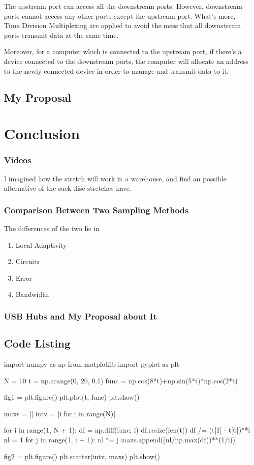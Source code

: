 \documentclass{article}
\begin{document}
The upstream port can access all the downstream ports. However, downstream ports cannot access any other ports except the upstream port. What's more, Time Division Multiplexing are applied to avoid the mess that all downstream ports transmit data at the same time.

Moreover, for a computer which is connected to the upstream port, if there's a device connected to the downstream ports, the computer will allocate an address to the newly connected device in order to manage and transmit data to it.

\subsection{My Proposal}




\section{Conclusion}
\subsubsection*{Videos}
I imagined how the stretch will work in a warehouse, and find an possible alternative of the suck disc stretches have.
\subsubsection*{Comparison Between Two Sampling Methods}
The differences of the two lie in
\begin{enumerate}
	\item Local Adaptivity
	\item Circuits
	\item Error
	\item Bandwidth
\end{enumerate}
\subsubsection*{USB Hubs and My Proposal about It}




\begin{appendices}
\section{Code Listing}
\begin{python}
import numpy as np
from matplotlib import pyplot as plt

N = 10
t = np.arange(0, 20, 0.1)
func = np.cos(8*t)+np.sin(5*t)*np.cos(2*t)

fig1 = plt.figure()
plt.plot(t, func)
plt.show()

maxs = []
intv = [i for i in range(N)]

for i in range(1, N + 1):
    df = np.diff(func, i)
    df.resize(len(t))
    df /= (t[1] - t[0])**i
    nl = 1
    for j in range(1, i + 1):
        nl *= j
    maxs.append((nl/np.max(df))**(1/i))

fig2 = plt.figure()
plt.scatter(intv, maxs)
plt.show()
\end{python}
\end{appendices}
\end{document}
